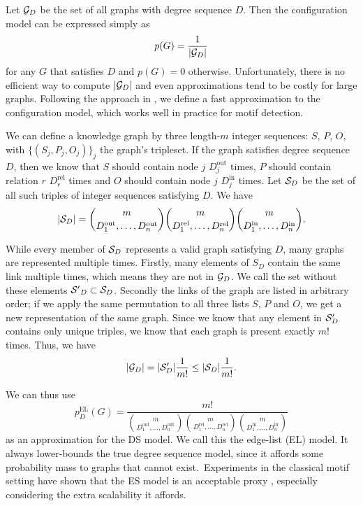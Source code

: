 \documentclass[11pt]{article}
\newcommand{\G}{{\cal G}}
\begin{document}
Let $\G_D$ be the set of all graphs with degree sequence $D$. Then the configuration model can be expressed simply as
\[
p(G) = \frac{1}{|\G_D|}
\]
for any $G$ that satisfies $D$ and $p(G) = 0$ otherwise. Unfortunately, there is no efficient way to compute $|\G_D|$ and even approximations tend to be costly for large graphs. Following the approach in \cite{bloem2017large}, we define a fast approximation to the configuration model, which works well in practice for motif detection. 

We can define a knowledge graph by three length-$m$ integer sequences: $S$, $P$, $O$, with $\{(S_j, P_j, O_j)\}_j$ the graph's tripleset. If the graph satisfies degree sequence $D$, then we know that $S$ should contain node $j$ $D^\text{out}_j$ times, $P$ should contain relation $r$ $D^\text{rel}_r$ times and $O$ should contain node $j$ $D^\text{in}_j$ times.  Let ${\cal S}_D$ be the set of all such triples of integer sequences satisfying $D$. We have 
\[
|{\cal S}_D| =
 {m \choose {D_1^\text{out}, \ldots, D_n^\text{out}} }
 {m \choose {D_1^\text{rel}, \ldots, D_n^\text{rel}} }
 {m \choose {D_1^\text{in}, \ldots, D_n^\text{in}} } \text{.}
\]

While every member of ${\cal S}_D$ represents a valid graph satisfying $D$, many graphs are represented multiple times. Firstly, many elements of ${S}_D$ contain the same link multiple times, which means they are not in ${\cal G}_D$. We call the set without these elements ${\cal S'}_D \subset {\cal S}_D$. Secondly the links of the graph are listed in arbitrary order; if we apply the same permutation to all three lists $S$, $P$ and $O$, we get a new representation of the same graph. Since we know that any element in ${\cal S}'_D$ contains only unique triples, we know that each graph is present exactly $m!$ times. Thus, we have
\[
|\G_D| = |{\cal S}'_D| \frac{1}{m!} \leq  |{\cal S}_D| \frac{1}{m!} \text{.}
\]

We can thus use 
\[
p^\text{EL}_D(G) =  \frac{m!}{{m \choose {D_1^\text{out}, \ldots, D_n^\text{out}} }
 {m \choose {D_1^\text{rel}, \ldots, D_n^\text{rel}} }
 {m \choose {D_1^\text{in}, \ldots, D_n^\text{in}} }}
\]
as an approximation for the DS model. We call this the edge-list (EL) model. It always lower-bounds the true degree sequence model, since it affords some probability mass to graphs that cannot exist.\footnotemark ~Experiments in the classical motif setting have shown that the ES model is an acceptable proxy \cite{bloem2017large}, especially considering the extra scalability it affords.
\end{document}
